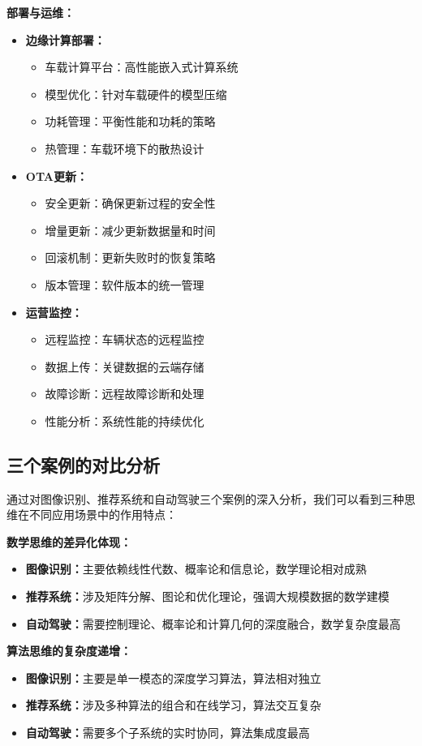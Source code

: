 \textbf{部署与运维：}
\begin{itemize}
\item \textbf{边缘计算部署：}
\begin{itemize}
\item 车载计算平台：高性能嵌入式计算系统
\item 模型优化：针对车载硬件的模型压缩
\item 功耗管理：平衡性能和功耗的策略
\item 热管理：车载环境下的散热设计
\end{itemize}
\item \textbf{OTA更新：}
\begin{itemize}
\item 安全更新：确保更新过程的安全性
\item 增量更新：减少更新数据量和时间
\item 回滚机制：更新失败时的恢复策略
\item 版本管理：软件版本的统一管理
\end{itemize}
\item \textbf{运营监控：}
\begin{itemize}
\item 远程监控：车辆状态的远程监控
\item 数据上传：关键数据的云端存储
\item 故障诊断：远程故障诊断和处理
\item 性能分析：系统性能的持续优化
\end{itemize}
\end{itemize}

\subsection{三个案例的对比分析}

通过对图像识别、推荐系统和自动驾驶三个案例的深入分析，我们可以看到三种思维在不同应用场景中的作用特点：

\textbf{数学思维的差异化体现：}
\begin{itemize}
\item \textbf{图像识别：}主要依赖线性代数、概率论和信息论，数学理论相对成熟
\item \textbf{推荐系统：}涉及矩阵分解、图论和优化理论，强调大规模数据的数学建模
\item \textbf{自动驾驶：}需要控制理论、概率论和计算几何的深度融合，数学复杂度最高
\end{itemize}

\textbf{算法思维的复杂度递增：}
\begin{itemize}
\item \textbf{图像识别：}主要是单一模态的深度学习算法，算法相对独立
\item \textbf{推荐系统：}涉及多种算法的组合和在线学习，算法交互复杂
\item \textbf{自动驾驶：}需要多个子系统的实时协同，算法集成度最高
\end{itemize}

